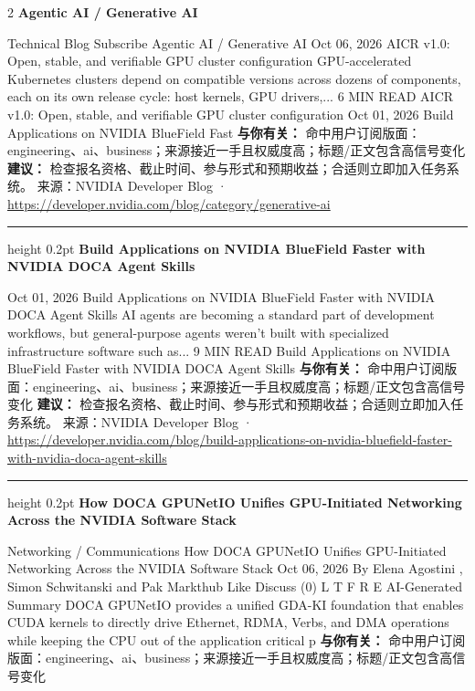 \documentclass[10.5pt]{ctexart}
\begin{document}
\begin{multicols}{2}
{\large\bfseries Agentic AI / Generative AI}\par
Technical Blog Subscribe Agentic AI / Generative AI Oct 06, 2026 AICR v1.0: Open, stable, and verifiable GPU cluster configuration GPU-accelerated Kubernetes clusters depend on compatible versions across dozens of components, each on its own release cycle: host kernels, GPU drivers,... 6 MIN READ AICR v1.0: Open, stable, and verifiable GPU cluster configuration Oct 01, 2026 Build Applications on NVIDIA BlueField Fast
\textbf{与你有关：} 命中用户订阅版面：engineering、ai、business；来源接近一手且权威度高；标题/正文包含高信号变化
\textbf{建议：} 检查报名资格、截止时间、参与形式和预期收益；合适则立即加入任务系统。
{\footnotesize\color{ormuted} 来源：NVIDIA Developer Blog · \url{https://developer.nvidia.com/blog/category/generative-ai}}
\vspace{2mm}
\hrule height 0.2pt
\vspace{2mm}
{\large\bfseries Build Applications on NVIDIA BlueField Faster with NVIDIA DOCA Agent Skills}\par
Oct 01, 2026 Build Applications on NVIDIA BlueField Faster with NVIDIA DOCA Agent Skills AI agents are becoming a standard part of development workflows, but general-purpose agents weren't built with specialized infrastructure software such as... 9 MIN READ Build Applications on NVIDIA BlueField Faster with NVIDIA DOCA Agent Skills
\textbf{与你有关：} 命中用户订阅版面：engineering、ai、business；来源接近一手且权威度高；标题/正文包含高信号变化
\textbf{建议：} 检查报名资格、截止时间、参与形式和预期收益；合适则立即加入任务系统。
{\footnotesize\color{ormuted} 来源：NVIDIA Developer Blog · \url{https://developer.nvidia.com/blog/build-applications-on-nvidia-bluefield-faster-with-nvidia-doca-agent-skills}}
\vspace{2mm}
\hrule height 0.2pt
\vspace{2mm}
{\large\bfseries How DOCA GPUNetIO Unifies GPU-Initiated Networking Across the NVIDIA Software Stack}\par
Networking / Communications How DOCA GPUNetIO Unifies GPU-Initiated Networking Across the NVIDIA Software Stack Oct 06, 2026 By Elena Agostini , Simon Schwitanski and Pak Markthub Like Discuss (0) L T F R E AI-Generated Summary DOCA GPUNetIO provides a unified GDA-KI foundation that enables CUDA kernels to directly drive Ethernet, RDMA, Verbs, and DMA operations while keeping the CPU out of the application critical p
\textbf{与你有关：} 命中用户订阅版面：engineering、ai、business；来源接近一手且权威度高；标题/正文包含高信号变化

\end{multicols}
\end{document}
